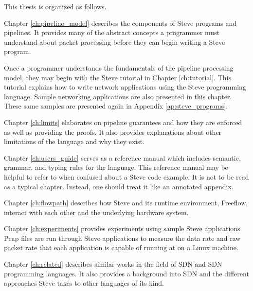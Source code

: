 This thesis is organized as follows.

Chapter \ref{ch:pipeline_model} describes the components of Steve programs
and pipelines. It provides many of the abstract concepts a programmer must
understand about packet processing before they can begin writing a Steve
program.

Once a programmer understands the fundamentals of the pipeline processing model,
they may begin with the Steve tutorial in Chapter \ref{ch:tutorial}.
This tutorial explains how to write network applications using the
Steve programming language. Sample networking applications are also presented in
this chapter. These same samples are presented again in Appendix
\ref{ap:steve_programs}.

Chapter \ref{ch:limits} elaborates on pipeline guarantees and how they are enforced
as well as providing the proofs. It also provides explanations about other 
limitations of the language and why they exist.

Chapter \ref{ch:users_guide} serves as a reference
manual which includes semantic, grammar, and typing rules for the language.
This reference manual may be helpful to refer to when confused about a
Steve code example.
It is not to be read as a typical chapter. Instead, one should 
treat it like an annotated appendix.

Chapter \ref{ch:flowpath} describes how Steve and its runtime environment,
Freeflow,
interact with each other and the underlying hardware system.

Chapter \ref{ch:experiments} provides experiments using sample Steve
applications. Pcap files are run through Steve applications to measure the data
rate and raw packet rate that each application is capable of running at on a
Linux machine.

Chapter \ref{ch:related} describes similar
works in the field of SDN and SDN programming languages. It also provides a
background into SDN and the different approaches Steve takes to other languages
of its kind.

